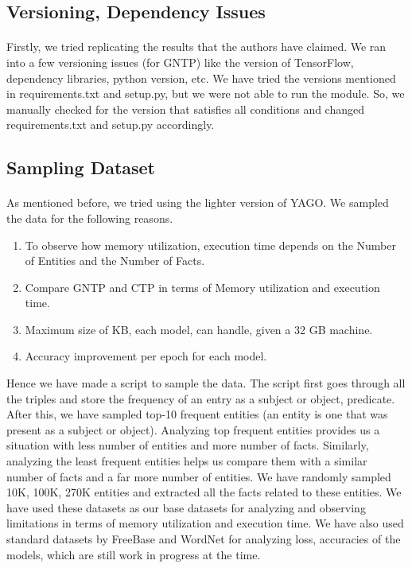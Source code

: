 \documentclass[Other]{iitddiss}
\begin{document}
\subsection{Versioning, Dependency Issues}
\paragraph{} 
Firstly, we tried replicating the results that the authors have claimed. We ran into a few versioning issues (for GNTP) like the version of TensorFlow, dependency libraries, python version, etc. We have tried the versions mentioned in requirements.txt and setup.py, but we were not able to run the module. So, we manually checked for the version that satisfies all conditions and changed requirements.txt and setup.py accordingly.

\subsection{Sampling Dataset}
\paragraph{} 
As mentioned before, we tried using the lighter version of YAGO. We sampled the data for the following reasons.

\begin{enumerate}
	\item To observe how memory utilization, execution time depends on the Number of Entities and the Number of Facts.
	\item Compare GNTP and CTP in terms of Memory utilization and execution time.
	\item Maximum size of KB, each model, can handle, given a 32 GB machine.
	\item Accuracy improvement per epoch for each model.
\end{enumerate}

Hence we have made a script to sample the data. The script first goes through all the triples and store the frequency of an entry as a subject or object, predicate. After this, we have sampled top-10 frequent entities (an entity is one that was present as a subject or object). Analyzing top frequent entities provides us a situation with less number of entities and more number of facts. Similarly, analyzing the least frequent entities helps us compare them with a similar number of facts and a far more number of entities. We have randomly sampled 10K, 100K, 270K entities and extracted all the facts related to these entities. We have used these datasets as our base datasets for analyzing and observing limitations in terms of memory utilization and execution time. We have also used standard datasets by FreeBase and WordNet for analyzing loss, accuracies of the models, which are still work in progress at the time.
\end{document}
